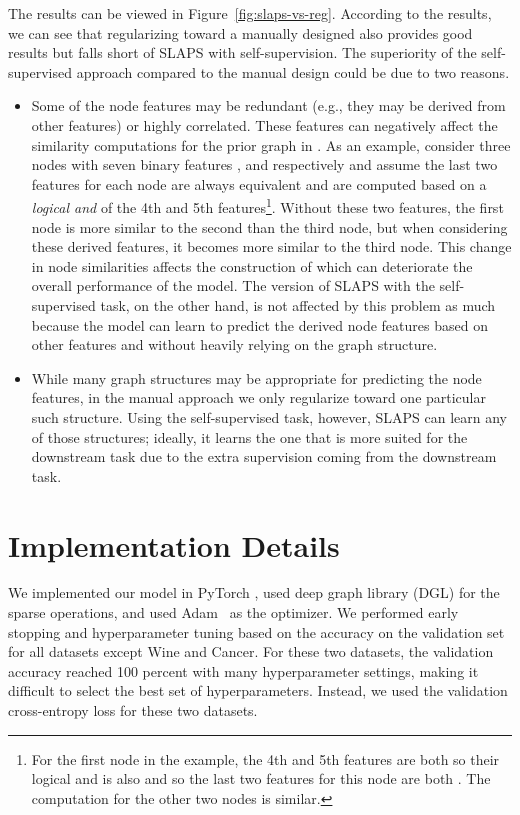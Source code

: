 \documentclass{article}
\begin{document}
The results can be viewed in Figure~\ref{fig:slaps-vs-reg}. According to the results, we can see that regularizing toward a manually designed  also provides good results but falls short of SLAPS with self-supervision. The superiority of the self-supervised approach compared to the manual design could be due to two reasons. 
\begin{itemize}
\item Some of the node features may be redundant (e.g., they may be derived from other features) or highly correlated. These features can negatively affect the similarity computations for the prior graph in . As an example, consider three nodes with seven binary features ,  and  respectively and assume the last two features for each node are always equivalent and are computed based on a \emph{logical and} of the 4th and 5th features\footnote{For the first node in the example, the 4th and 5th features are both  so their logical and is also  and so the last two features for this node are both . The computation for the other two nodes is similar.}. Without these two features, the first node is more similar to the second than the third node, but when considering these derived features, it becomes more similar to the third node. This change in node similarities affects the construction of  which can deteriorate the overall performance of the model. The version of SLAPS with the self-supervised task, on the other hand, is not affected by this problem as much because the model can learn to predict the derived node features based on other features and without heavily relying on the graph structure.

\item While many graph structures may be appropriate for predicting the node features, in the manual approach we only regularize toward one particular such structure. Using the self-supervised task, however, SLAPS can learn any of those structures; ideally, it learns the one that is more suited for the downstream task due to the extra supervision coming from the downstream task.
\end{itemize}

\section{Implementation Details}
We implemented our model in PyTorch \citep{paszke2017automatic}, used deep graph library (DGL) \citep{wang2019deep} for the sparse operations, and used Adam~\citep{adam} as the optimizer. We performed early stopping and hyperparameter tuning based on the accuracy on the validation set for all datasets except Wine and Cancer. For these two datasets, the validation accuracy reached 100 percent with many hyperparameter settings, making it difficult to select the best set of hyperparameters. Instead, we used the validation cross-entropy loss for these two datasets. 
\end{document}
